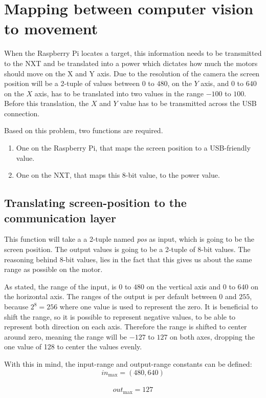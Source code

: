\section{Mapping between computer vision to movement}\label{sec:mappingcompvis}
When the Raspberry Pi locates a target, this information needs to be transmitted to the NXT and be translated into a power which dictates how much the motors should move on the X and Y axis.
Due to the resolution of the camera the screen position will be a 2-tuple of values between $0$ to $480$, on the $Y$ axis, and $0$ to $640$ on the $X$ axis, has to be translated into two values in the range $-100$ to $100$.
Before this translation, the $X$ and $Y$ value has to be transmitted across the USB connection.

Based on this problem, two functions are required.
\begin{enumerate}
	\item One on the Raspberry Pi, that maps the screen position to a USB-friendly value.
	\item One on the NXT, that maps this 8-bit value, to the power value.
\end{enumerate}


\subsection{Translating screen-position to the communication layer}
This function will take a a 2-tuple named \textit{pos} as input, which is going to be the screen position.
The output values is going to be a 2-tuple of 8-bit values.
The reasoning behind 8-bit values, lies in the fact that this gives us about the same range as possible on the motor.

As stated, the range of the input, is $0$ to $480$ on the vertical axis and $0$ to $640$ on the horizontal axis.
The ranges of the output is per default between $0$ and $255$, because $2^8 = 256 $ where one value is used to represent the zero.
It is beneficial to shift the range, so it is possible to represent negative values, to be able to represent both direction on each axis.
Therefore the range is shifted to center around zero, meaning the range will be $-127$ to $127$ on both axes, dropping the one value of 128 to center the values evenly.

With this in mind, the input-range and output-range constants can be defined:\\
$$in_\text{max} = (480,640)$$\\
$$out_\text{max} = 127$$

